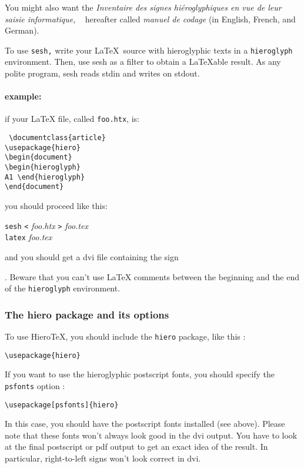 \documentclass[final]{article}
\newcommand{\HieroTeX}{Hiero\TeX{}}
\begin{document}
You might also want the {\em Inventaire des signes hi\'eroglyphiques
  en vue de leur saisie informatique, \/}~\cite{MANCOD} hereafter
called {\em manuel de codage\/} (in English, French, and German).

To use \texttt{sesh,} write your \LaTeX\ source with hieroglyphic texts in a
\verb|hieroglyph| environment. Then, use sesh as a filter to obtain a 
\LaTeX able result. As any polite program, sesh reads stdin and writes
on stdout. 

\paragraph{example:} 
if your \LaTeX{} file, called \verb/foo.htx/, is:
\begin{flushleft} \tt
  \verb/\/\verb/documentclass{article}/\\
  \verb/\/\verb/usepackage{hiero}/\\
  \verb.\.\verb/begin{document}/ \\
  \verb.\.\verb/begin{hieroglyph}/\\
  A1
  \verb/\/\verb/end{hieroglyph}/\\
  \verb/\/\verb/end{document}/\\
\end{flushleft}
you should proceed like this:
\begin{flushleft}
  \texttt{sesh} \texttt{<} \textsl{foo.htx} \texttt{>} \textsl{foo.tex}\\
  \texttt{latex} {\sl foo.tex}
\end{flushleft}
and you should get a dvi file containing the sign 
\begin{hieroglyph}{\leavevmode {}}\end{hieroglyph}.
Beware that you can't use \LaTeX{} comments between the 
beginning and the end of the \verb/hieroglyph/ environment. 


\subsubsection{The hiero package and its options}

To use \HieroTeX{}, you should include the \texttt{hiero} package,
like this :
\begin{verbatim}
\usepackage{hiero}
\end{verbatim}

If you want to use the hieroglyphic postscript fonts, you should specify the \texttt{psfonts} option :
\begin{verbatim}
\usepackage[psfonts]{hiero}
\end{verbatim}
In this case, you should have the postscript fonts installed (see
above). Please note that these fonts won't always look good in the dvi
output. You have to look at the final postscript or pdf output to get
an exact idea of the result. In particular, right-to-left signs won't
look correct in dvi.
\end{document}
